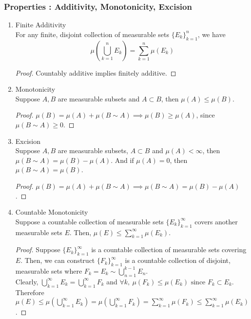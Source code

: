 \subsubsection{Properties : Additivity, Monotonicity, Excision}
\begin{enumerate}
	\item Finite Additivity \\
		For any finite, disjoint collection of measurable sets $\{ E_k \}_{k = 1}^n$, we have
		\[ \mu\left(\bigcup_{k=1}^n E_k\right) = \sum_{k=1}^n \mu(E_k) \]
		\begin{proof}
			Countably additive implies finitely additive.
		\end{proof}
	\item Monotonicity \\
		Suppose $A,B$ are measurable subsets and $A \subset B$, then $\mu(A) \le \mu(B)$.
		\begin{proof}
			$\mu(B) = \mu(A) + \mu(B \sim A) \implies \mu(B) \ge \mu(A)$, since $\mu(B \sim A) \ge 0$.
		\end{proof}
	\item Excision \\
		Suppose $A,B$ are measurable subsets, $A \subset B$ and $\mu(A) < \infty$, then $\mu(B \sim A) = \mu(B) - \mu(A)$. And if $\mu(A) = 0$, then $\mu(B \sim A) = \mu(B)$.
		\begin{proof}
			$\mu(B) = \mu(A) + \mu(B \sim A) \implies \mu(B \sim A ) = \mu(B) - \mu(A)$.
		\end{proof}
	\item Countable Monotonicity \\
		Suppose a countable collection of measurable sets $\{ E_k \}_{k=1}^\infty$ covers another measurable sets $E$.
		Then, $\displaystyle \mu(E) \le \sum_{k=1}^\infty \mu(E_k)$.
		\begin{proof}
			Suppose $\{ E_k \}_{k=1}^\infty$ is a countable collection of measurable sets covering $E$.
			Then, we can construct $\{ F_k \}_{k=1}^\infty$ is a countable collection of disjoint, measurable sets where $\displaystyle F_k = E_k \sim \bigcup_{n=1}^{k-1} E_n$.\\

			Clearly, $\displaystyle \bigcup_{k=1}^\infty E_k = \bigcup_{k=1}^\infty F_k$ and $\forall k,\ \mu(F_k) \le \mu(E_k) \text{ since } F_k \subset E_k$.\\
			Therefore $\displaystyle \mu(E) \le \mu \left(\bigcup_{k=1}^\infty E_k \right) = \mu \left( \bigcup_{k=1}^\infty F_k \right) = \sum_{k=1}^\infty \mu(F_k) \le \sum_{k=1}^\infty \mu(E_k)$.
		\end{proof}
\end{enumerate}
